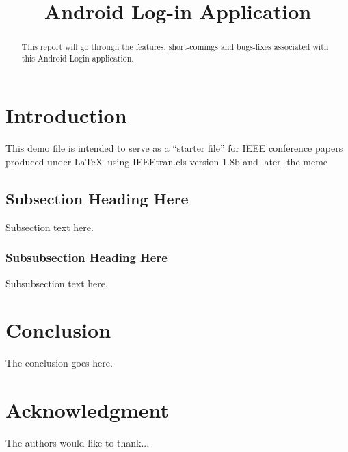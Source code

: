 \documentclass[conference]{IEEEtran}
\begin{document}
\title{Android Log-in Application}

\author{
}

\maketitle

\begin{abstract}
This report will go through the features, short-comings and bugs-fixes associated with 
this Android Login application.
\end{abstract}

\IEEEpeerreviewmaketitle

\section{Introduction}

This demo file is intended to serve as a ``starter file''
for IEEE conference papers produced under \LaTeX\ using
IEEEtran.cls version 1.8b and later.
the meme

\subsection{Subsection Heading Here}
Subsection text here.

\subsubsection{Subsubsection Heading Here}
Subsubsection text here.

\section{Conclusion}
The conclusion goes here.

\section*{Acknowledgment}

The authors would like to thank...

\end{document}
